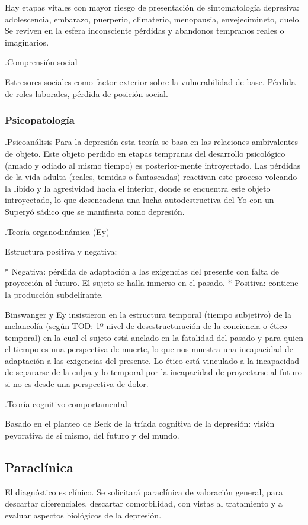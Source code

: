 Hay etapas vitales con mayor riesgo de presentación de sintomatología depresiva: adolescencia, embarazo, puerperio, climaterio, menopausia, envejecimineto, duelo. Se reviven en la esfera inconsciente pérdidas y abandonos tempranos reales o imaginarios.

.Comprensión social

Estresores sociales como factor exterior sobre la vulnerabilidad de base. Pérdida de roles laborales, pérdida de posición social.
\subsubsection*{Psicopatología}
.Psicoanálisis
Para la depresión esta teoría se basa en las relaciones ambivalentes de objeto. Este objeto perdido en etapas tempranas del desarrollo psicológico (amado y odiado al mismo tiempo) es posterior-mente introyectado. Las pérdidas de la vida adulta (reales, temidas o fantaseadas) reactivan este proceso volcando la libido y la agresividad hacia el interior, donde se encuentra este objeto introyectado, lo que desencadena una lucha autodestructiva del Yo con un Superyó sádico que se manifiesta como depresión.

.Teoría organodinámica (Ey)

Estructura positiva y negativa:

* Negativa: pérdida de adaptación a las exigencias del presente con falta de proyección al futuro. El sujeto se halla inmerso en el pasado.
* Positiva: contiene la producción subdelirante.

Binswanger y Ey insistieron en la estructura temporal (tiempo subjetivo) de la melancolía (según TOD: 1º nivel de desestructuración de la conciencia o ético-temporal) en la cual el sujeto está anclado en la fatalidad del pasado y para quien el tiempo es una perspectiva de muerte, lo que nos muestra una incapacidad de adaptación a las exigencias del presente. Lo ético está vinculado a la incapacidad de separarse de la culpa y lo temporal por la incapacidad de proyectarse al futuro si no es desde una perspectiva de dolor.

.Teoría cognitivo-comportamental

Basado en el planteo de Beck de la tríada cognitiva de la depresión: visión peyorativa de sí mismo, del futuro y del mundo.
\subsection*{Paraclínica}
El diagnóstico es clínico. Se solicitará paraclínica de valoración general, para descartar diferenciales, descartar comorbilidad, con vistas al tratamiento y a evaluar aspectos biológicos de la depresión.

